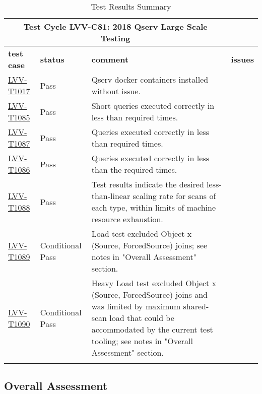 \documentclass[DM,STR,toc]{lsstdoc}
\begin{document}
\begin{longtable}{p{}p{}p{}p{}}
\toprule

  \multicolumn{3}{c}{ Test Cycle {\bf LVV-C81: 2018 Qserv Large Scale Testing
 }} \\\hline

  {\bf \footnotesize test case} & {\bf \footnotesize status} & {\bf \footnotesize comment} & {\bf \footnotesize issues} \\\toprule

    \href{https://jira.lsstcorp.org/secure/Tests.jspa#/testCase/LVV-T1017}{LVV-T1017}
    & Pass & Qserv docker containers installed without issue.
 &
    \\\hline
    \href{https://jira.lsstcorp.org/secure/Tests.jspa#/testCase/LVV-T1085}{LVV-T1085}
    & Pass & Short queries executed correctly in less than required times.
 &
    \\\hline
    \href{https://jira.lsstcorp.org/secure/Tests.jspa#/testCase/LVV-T1087}{LVV-T1087}
    & Pass & Queries executed correctly in less than required times.
 &
    \\\hline
    \href{https://jira.lsstcorp.org/secure/Tests.jspa#/testCase/LVV-T1086}{LVV-T1086}
    & Pass & Queries executed correctly in less than the required times.
 &
    \\\hline
    \href{https://jira.lsstcorp.org/secure/Tests.jspa#/testCase/LVV-T1088}{LVV-T1088}
    & Pass & Test results indicate the desired less-than-linear scaling rate for
scans of each type, within limits of machine resource exhaustion.
 &
    \\\hline
    \href{https://jira.lsstcorp.org/secure/Tests.jspa#/testCase/LVV-T1089}{LVV-T1089}
    & Conditional Pass & Load test excluded Object x (Source, ForcedSource) joins; see notes in
"Overall Assessment" section.
 &
    \\\hline
    \href{https://jira.lsstcorp.org/secure/Tests.jspa#/testCase/LVV-T1090}{LVV-T1090}
    & Conditional Pass & Heavy Load test excluded Object x (Source, ForcedSource) joins and was
limited by maximum shared-scan load that could be accommodated by the
current test tooling; see notes in "Overall Assessment" section.
 &
    \\\hline

\caption{Test Results Summary}
\label{table:summary}
\end{longtable}

\subsection{Overall Assessment}
\label{sect:overallassessment}
\end{document}
